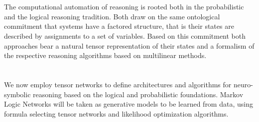 \documentclass[
    final,
    paper=a4,
    pagesize=auto,
    fontsize=10pt, %
    version=last,
]{scrbook}
\begin{document}
    \listoftodos

    \frontmatter

    

    \pagestyle{scrplain}

    \cleardoublepage

    \tableofcontents

    
    
    

    \mainmatter

    \part{\partonetext}\label{par:one}

    The computational automation of reasoning is rooted both in the probabilistic and the logical reasoning tradition.
    Both draw on the same ontological commitment that systems have a factored structure, that is their states are described by assignments to a set of variables.
    Based on this commitment both approaches bear a natural tensor representation of their states and a formalism of the respective reasoning algorithms based on multilinear methods.

    
    

    
    


    \part{\parttwotext}\label{par:two}

    We now employ tensor networks to define architectures and algorithms for neuro-symbolic reasoning based on the logical and probabilistic foundations.
    Markov Logic Networks will be taken as generative models to be learned from data, using formula selecting tensor networks and likelihood optimization algorithms.

    

    
    

    
\end{document}
